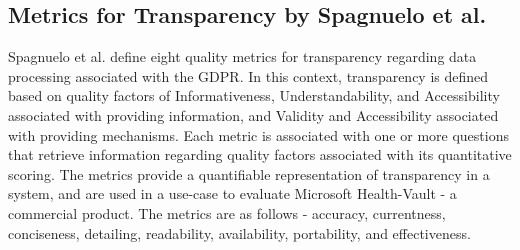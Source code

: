 \subsection*{Metrics for Transparency by Spagnuelo et al.}
Spagnuelo et al. \cite{livraga_metrics_2016} define eight quality metrics for transparency regarding data processing associated with the GDPR.
In this context, transparency is defined based on quality factors of Informativeness, Understandability, and Accessibility associated with providing information, and Validity and Accessibility associated with providing mechanisms.
Each metric is associated with one or more questions that retrieve information regarding quality factors associated with its quantitative scoring.
The metrics provide a quantifiable representation of transparency in a system, and are used in a use-case to evaluate Microsoft Health-Vault - a commercial product.
The metrics are as follows - accuracy, currentness, conciseness, detailing, readability, availability, portability, and effectiveness.

